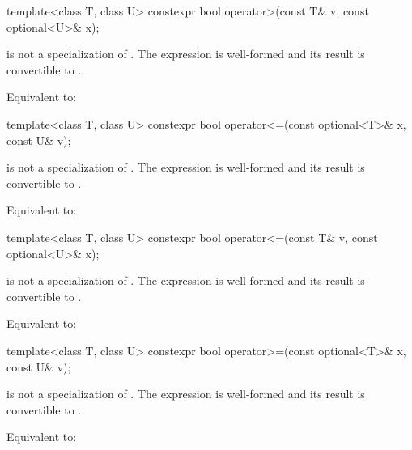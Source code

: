%
\begin{itemdecl}
template<class T, class U> constexpr bool operator>(const T& v, const optional<U>& x);
\end{itemdecl}

\begin{itemdescr}
\pnum
\constraints
{} is not a specialization of .
The expression  is well-formed and
its result is convertible to .

\pnum
\effects
Equivalent to: 
\end{itemdescr}

%
\begin{itemdecl}
template<class T, class U> constexpr bool operator<=(const optional<T>& x, const U& v);
\end{itemdecl}

\begin{itemdescr}
\pnum
\constraints
{} is not a specialization of .
The expression  is well-formed and
its result is convertible to .

\pnum
\effects
Equivalent to: 
\end{itemdescr}

%
\begin{itemdecl}
template<class T, class U> constexpr bool operator<=(const T& v, const optional<U>& x);
\end{itemdecl}

\begin{itemdescr}
\pnum
\constraints
{} is not a specialization of .
The expression  is well-formed and
its result is convertible to .

\pnum
\effects
Equivalent to: 
\end{itemdescr}

%
\begin{itemdecl}
template<class T, class U> constexpr bool operator>=(const optional<T>& x, const U& v);
\end{itemdecl}

\begin{itemdescr}
\pnum
\constraints
{} is not a specialization of .
The expression  is well-formed and
its result is convertible to .

\pnum
\effects
Equivalent to: 
\end{itemdescr}

